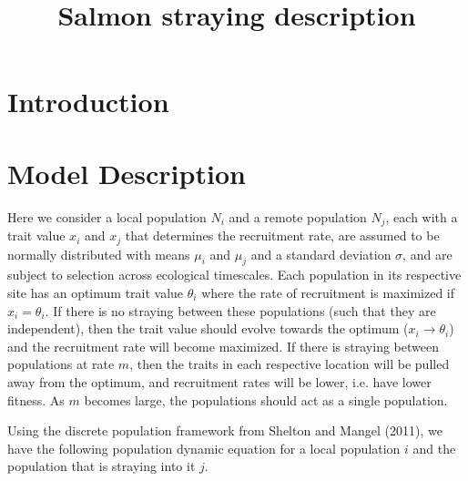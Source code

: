 \documentclass[onecolumn,preprintnumbers,amsmath,amssymb,superscriptaddress]{revtex4}
\begin{document}
\title{Salmon straying description}



\maketitle



\section*{Introduction}


\section*{Model Description}

Here we consider a local population $N_i$ and a remote population $N_j$, each with a trait value $x_i$ and $x_j$ that determines the recruitment rate, are assumed to be normally distributed with means $\mu_i$ and $\mu_j$ and a standard deviation $\sigma$, and are subject to selection across ecological timescales.
Each population in its respective site has an optimum trait value $\theta_i$ where the rate of recruitment is maximized if $x_i = \theta_i$.
If there is no straying between these populations (such that they are independent), then the trait value should evolve towards the optimum ($x_i \rightarrow \theta_i$) and the recruitment rate will become maximized.
If there is straying between populations at rate $m$, then the traits in each respective location will be pulled away from the optimum, and recruitment rates will be lower, i.e. have lower fitness.
As $m$ becomes large, the populations should act as a single population.


Using the discrete population framework from Shelton and Mangel (2011), we have the following population dynamic equation for a local population $i$ and the population that is straying into it $j$.
\end{document}
